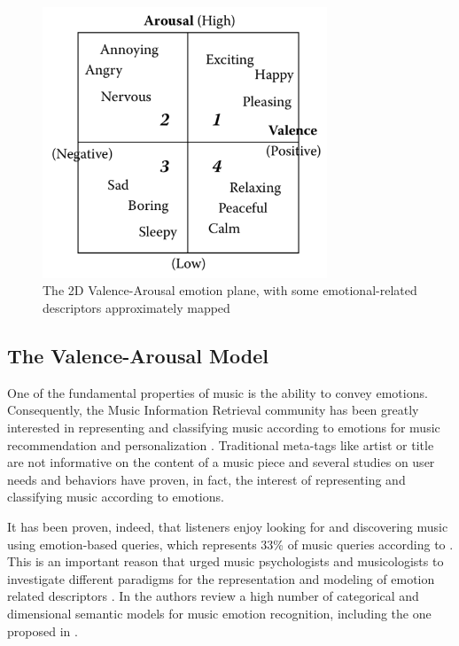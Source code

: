  \begin{figure}[tbp]
    \begin{center}
      \includegraphics[width=8.5cm]{img/HLFs/VAmoods}
    \end{center}
  \caption{The 2D Valence-Arousal emotion plane, with some emotional-related descriptors approximately mapped \cite{Yang2012}}
  \label{fig:HLFs:VAmoods}
\end{figure}

\subsection{The Valence-Arousal Model}\label{sec:HLFs:VA}
One of the fundamental properties of music is the ability to convey emotions\cite{Yang2012}. Consequently, the Music Information Retrieval community has been greatly interested in representing and classifying music according to emotions for music recommendation and personalization \cite{Barthet2012, Juslin:2001, Juslin2011, Lee2004, Yang2012}. Traditional meta-tags like artist or title are not informative on the content of a music piece and several studies \cite{Juslin:2001, Juslin2011, Lee2004, Yang2012} on user needs and behaviors have proven, in fact, the interest of representing and classifying music according to emotions. 

It has been proven, indeed, that listeners enjoy looking for and discovering music using emotion-based queries, which represents 33\% of music queries according to \cite{Lee2004}. This is an important reason that urged music psychologists and musicologists to investigate different paradigms for the representation and modeling of emotion related descriptors \cite{Juslin:2001, Juslin2011, Lee2004}. In \cite{Barthet2013} the authors review a high number of categorical and dimensional semantic models for music emotion recognition, including the one proposed in \cite{Russell1980}.

